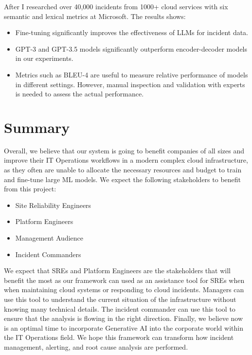 \documentclass[conference]{IEEEtran}
\begin{document}
After I researched over 40,000 incidents from 1000+ cloud services with six semantic and lexical metrics at Microsoft.\cite{10172904}  The results shows:
\begin{itemize}
    \item Fine-tuning significantly improves the effectiveness of LLMs for incident data.
    \item GPT-3 and GPT-3.5 models significantly outperform encoder-decoder models in our experiments.
    \item Metrics such as BLEU-4 are useful to measure relative performance of models in different settings. However, manual inspection and validation with experts is needed to assess the actual performance.
\end{itemize}

\section{Summary}

Overall, we believe that our system is going to benefit companies of all sizes and improve their IT Operations workflows in a modern complex cloud infrastructure, as they often are unable to allocate the necessary resources and budget to train and fine-tune large ML models. We expect the following stakeholders to benefit from this project:
\begin{itemize}
    \item Site Reliability Engineers
    \item Platform Engineers 
    \item Management Audience 
    \item Incident Commanders 
\end{itemize}

We expect that SREs and Platform Engineers are the stakeholders that will benefit the most as our framework can used as an assistance tool for SREs when when maintaining cloud systems or responding to cloud incidents. Managers can use this tool to understand the current situation of the infrastructure without knowing many technical details. The incident commander can use this tool to ensure that the analysis is flowing in the right direction. Finally, we believe now is an optimal time to incorporate Generative AI into the corporate world within the IT Operations field. We hope this framework can transform how incident management, alerting, and root cause analysis are performed. 




\vspace{12pt}
\end{document}
